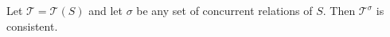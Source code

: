 Let $\mathcal{T} = \mathcal{T}(S)$ and let $\sigma$ be any set of concurrent relations of $S$. Then $\mathcal{T}^\sigma$ is consistent.
